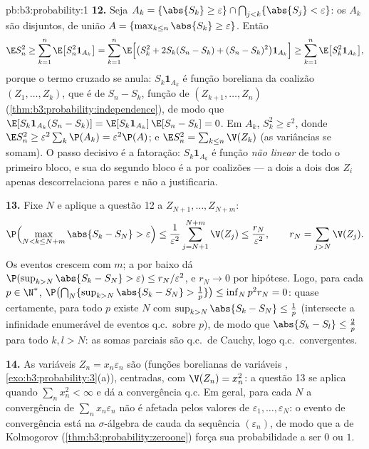 \begin{solution}{pb:b3:probability:1}
\textbf{12.} Seja $A_k = \{\abs{S_k} \geq \varepsilon\} \cap
\bigcap_{j<k}\{\abs{S_j} < \varepsilon\}$: os $A_k$ são
disjuntos, de união $A = \{\max_{k\leq n}\abs{S_k} \geq
\varepsilon\}$. Então
\[
\E S_n^2 \geq \sum_{k=1}^n\E\bigl[S_n^2\mathbf 1_{A_k}\bigr]
= \sum_{k=1}^n\E\Bigl[\bigl(S_k^2 + 2S_k(S_n - S_k) + (S_n
- S_k)^2\bigr)\mathbf 1_{A_k}\Bigr]
\geq \sum_{k=1}^n\E\bigl[S_k^2\mathbf 1_{A_k}\bigr],
\]
porque o termo cruzado se anula: $S_k\mathbf 1_{A_k}$ é
função boreliana da coalizão $(Z_1, \dots, Z_k)$, que
é  de $S_n - S_k$, função de $(Z_{k+1},
\dots, Z_n)$ (\cref{thm:b3:probability:independence}), de modo que
$\E[S_k\mathbf 1_{A_k}(S_n - S_k)] = \E[S_k\mathbf
1_{A_k}]\,\E[S_n - S_k] = 0$. Em $A_k$, $S_k^2 \geq
\varepsilon^2$, donde $\E S_n^2 \geq
\varepsilon^2\sum_k\P(A_k) = \varepsilon^2\P(A)$; e $\E
S_n^2 = \sum_{k\leq n}\V(Z_k)$ (as variâncias se somam). O
passo decisivo é a fatoração: $S_k\mathbf 1_{A_k}$ é
função \emph{não linear} de todo o primeiro bloco, e
sua  do segundo bloco é a  por
coalizões --- a  dois a dois dos $Z_i$ apenas
descorrelaciona pares e não a justificaria.

\textbf{13.} Fixe $N$ e aplique a questão 12 a $Z_{N+1},
\dots, Z_{N+m}$:
\[
\P\Bigl(\max_{N < k \leq N+m}\abs{S_k - S_N} >
\varepsilon\Bigr) \leq
\frac1{\varepsilon^2}\sum_{j=N+1}^{N+m}\V(Z_j) \leq
\frac{r_N}{\varepsilon^2},
\qquad r_N = \sum_{j>N}\V(Z_j) .
\]
Os eventos crescem com $m$; a  por baixo dá
$\P(\sup_{k>N}\abs{S_k - S_N} > \varepsilon) \leq
r_N/\varepsilon^2$, e $r_N \to 0$ por hipótese. Logo,
para cada $p \in \N^*$, $\P\bigl(\bigcap_N\{\sup_{k>N}
\abs{S_k - S_N} > \frac1p\}\bigr) \leq \inf_Np^2r_N = 0$:
quase certamente, para todo $p$ existe $N$ com
$\sup_{k>N}\abs{S_k - S_N} \leq \frac1p$ (intersecte a
infinidade enumerável de eventos q.c.\ sobre $p$), de modo que $\abs{S_k -
S_l} \leq \frac2p$ para todo $k, l > N$: as somas parciais
são q.c.\ de Cauchy, logo q.c.\ convergentes.

\textbf{14.} As variáveis $Z_n = x_n\varepsilon_n$ são
 (funções borelianas de variáveis ,
\cref{exo:b3:probability:3}(a)), centradas, com $\V(Z_n) =
x_n^2$: a questão 13 se aplica quando $\sum_nx_n^2 < \infty$ e
dá a convergência q.c. Em geral, para cada $N$ a
convergência de $\sum_nx_n\varepsilon_n$ não é afetada pelos
valores de $\varepsilon_1, \dots, \varepsilon_N$: o
evento de convergência está na $\sigma$-álgebra de cauda da
sequência  $(\varepsilon_n)$, de modo que a  de
Kolmogorov (\cref{thm:b3:probability:zeroone}) força
sua probabilidade a ser $0$ ou $1$.


\end{solution}
